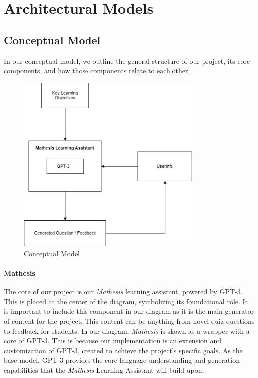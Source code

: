 \documentclass[12pt,a4paper]{article}
\begin{document}
    \section{Architectural Models}

    \subsection{Conceptual Model}
    
    In our conceptual model, we outline the general structure of our project, its core components,
    and how those components relate to each other.

    \begin{figure}[H]
        \centering
        \includegraphics[width=0.8\textwidth]{images/conceptualDiagram}
        \caption{Conceptual Model}
        \label{fig:conceptualModel}
    \end{figure}
    

    \paragraph{Mathesis}
    The core of our project is our \textit{Mathesis}
    learning assistant, powered by GPT-3.  This is placed at the center of the diagram, symbolizing
    its foundational role. It is important to include this component in our diagram as it is the main
    generator of content for the project.  This content can be anything from novel quiz questions to
    feedback for students. In our diagram, \textit{Mathesis} is shown as a wrapper with a core of
    GPT-3.  This is because our implementation is an extension and customization of GPT-3, created
    to achieve the project's specific goals. As the base model, GPT-3 provides the core language
    understanding and generation capabilities that the \textit{Mathesis} Learning Assistant will build
    upon.
\end{document}
